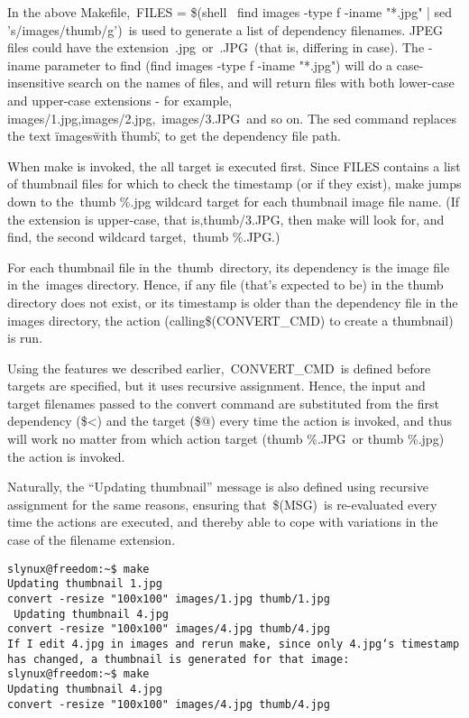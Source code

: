 \documentclass[output=paper, 
colorlinks,
citecolor=brown,
newtxmath
]{langscibook}
\begin{document}
In the above Makefile, FILES = \$(shell  find images -type f -iname "*.jpg" | sed 's/images/thumb/g') is used to generate a list of dependency filenames. JPEG files could have the extension .jpg or .JPG (that is, differing in case).
The -iname parameter to find (find images -type f -iname "*.jpg")
will do a case-insensitive search on the names of files, and will 
return files with both lower-case and upper-case extensions - for example, 
images/1.jpg,images/2.jpg, images/3.JPG and so on.
The sed command replaces the text \"images\" with \"thumb\", to get the dependency file path.

When make is invoked, the all target is executed first. Since FILES contains a list of thumbnail files for which to check the timestamp (or if they exist), make jumps down to the thumb \%.jpg wildcard target for each thumbnail image file name. (If the extension is upper-case, that is,thumb/3.JPG, then make will look for, and find, the second wildcard target, thumb \%.JPG.)

For each thumbnail file in the thumb directory, its dependency is the 
image file in the images directory. 
Hence, if any file (that's expected to be) in the thumb directory does not
exist, or its timestamp is older than the dependency file in the images
directory, the action
(calling\$(CONVERT\_CMD) to create a thumbnail) is run.

Using the features we described earlier, CONVERT\_CMD is defined before targets are specified, but it uses recursive assignment. Hence, the input and target filenames passed to the convert command are substituted from the first dependency (\$<) and the target (\$@) every time the action is invoked, and thus will work no matter from which action target (thumb \%.JPG or thumb \%.jpg) the action is invoked.

Naturally, the “Updating thumbnail” message is also defined using recursive assignment for the same reasons, ensuring that \$(MSG) is re-evaluated every time the actions are executed, and thereby able to cope with variations in the case of the filename extension.

\begin{verbatim}
slynux@freedom:~$ make
Updating thumbnail 1.jpg
convert -resize "100x100" images/1.jpg thumb/1.jpg
 Updating thumbnail 4.jpg
convert -resize "100x100" images/4.jpg thumb/4.jpg
If I edit 4.jpg in images and rerun make, since only 4.jpg‘s timestamp has changed, a thumbnail is generated for that image:
slynux@freedom:~$ make
Updating thumbnail 4.jpg
convert -resize "100x100" images/4.jpg thumb/4.jpg
\end{verbatim}
\end{document}
